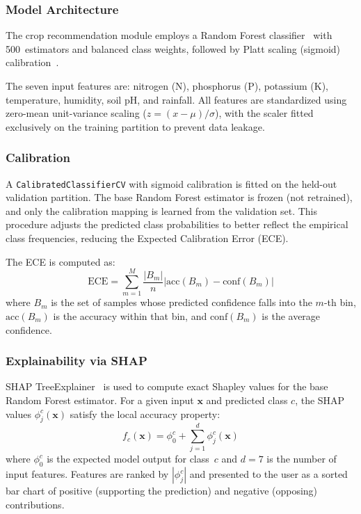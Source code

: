 \documentclass[conference]{IEEEtran}
\begin{document}
\subsubsection{Model Architecture}
The crop recommendation module employs a Random Forest classifier~\cite{breiman2001random} with 500~estimators and balanced class weights, followed by Platt scaling (sigmoid) calibration~\cite{platt1999probabilistic}.

The seven input features are: nitrogen (N), phosphorus (P), potassium (K), temperature, humidity, soil pH, and rainfall. All features are standardized using zero-mean unit-variance scaling ($z = (x - \mu) / \sigma$), with the scaler fitted exclusively on the training partition to prevent data leakage.

\subsubsection{Calibration}
A \texttt{CalibratedClassifierCV} with sigmoid calibration is fitted on the held-out validation partition. The base Random Forest estimator is frozen (not retrained), and only the calibration mapping is learned from the validation set. This procedure adjusts the predicted class probabilities to better reflect the empirical class frequencies, reducing the Expected Calibration Error (ECE).

The ECE is computed as:
\begin{equation}
  \text{ECE} = \sum_{m=1}^{M} \frac{|B_{m}|}{n} \left| \text{acc}(B_{m}) - \text{conf}(B_{m}) \right|
\end{equation}
where $B_{m}$ is the set of samples whose predicted confidence falls into the $m$-th bin, $\text{acc}(B_{m})$ is the accuracy within that bin, and $\text{conf}(B_{m})$ is the average confidence.

\subsubsection{Explainability via SHAP}
SHAP TreeExplainer~\cite{lundberg2017unified,lundberg2020local2global} is used to compute exact Shapley values for the base Random Forest estimator. For a given input $\mathbf{x}$ and predicted class $c$, the SHAP values $\phi_{j}^{c}(\mathbf{x})$ satisfy the local accuracy property:
\begin{equation}
  f_{c}(\mathbf{x}) = \phi_{0}^{c} + \sum_{j=1}^{d} \phi_{j}^{c}(\mathbf{x})
\end{equation}
where $\phi_{0}^{c}$ is the expected model output for class~$c$ and $d = 7$ is the number of input features. Features are ranked by $|\phi_{j}^{c}|$ and presented to the user as a sorted bar chart of positive (supporting the prediction) and negative (opposing) contributions.
\end{document}
